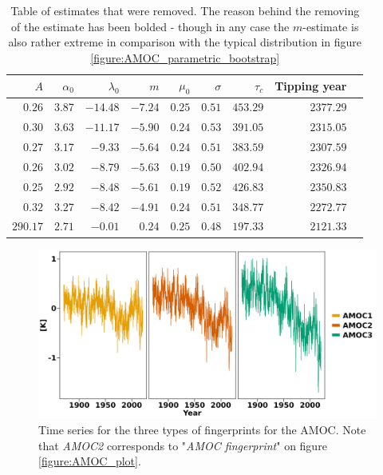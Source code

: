     \begin{table}[ht]
        \centering
        \begin{tabular}{rrrrrrrrr}
            \hline
            $A$ & $\alpha_0$ & $\lambda_0$ & $m$ & $\mu_0$ & $\sigma$ & $\tau_c$ & Tipping year \\ 
            \hline
            $0.26$ & $3.87$ & $-14.48$ & $-7.24$ & $0.25$ & $0.51$ & $453.29$ & $2377.29$ \\ 
            $0.30$ & $3.63$ & $-11.17$ & $-5.90$ & $0.24$ & $0.53$ & $391.05$ & $2315.05$ \\ 
            $0.27$ & $3.17$ & $-9.33$ & $-5.64$ & $0.24$ & $0.51$ & $383.59$ & $2307.59$ \\ 
            $0.26$ & $3.02$ & $-8.79$ & $-5.63$ & $0.19$ & $0.50$ & $402.94$ & $2326.94$ \\ 
            $0.25$ & $2.92$ & $-8.48$ & $-5.61$ & $0.19$ & $0.52$ & $426.83$ & $2350.83$ \\ 
            $0.32$ & $3.27$ & $-8.42$ & $-4.91$ & $0.24$ & $0.51$ & $348.77$ & $2272.77$ \\ 
            $290.17$ & $2.71$ & $-0.01$ & $0.24$& $0.25$ & $0.48$ & $197.33$ & $2121.33$ \\ 
             \hline
        \end{tabular}
        \caption{Table of estimates that were removed. The reason behind the removing of the estimate has been bolded - though in any case the $m$-estimate is also rather extreme in comparison with the typical distribution in figure \ref{figure:AMOC_parametric_bootstrap}}
        \label{table:extreme_amoc_estimates}
    \end{table}
    \begin{figure}[h!]
        \begin{center}
            \includegraphics[scale = .1]{figures/AMOC_alt_plot.jpeg}
            \caption{Time series for the three types of fingerprints for the AMOC. Note that \textit{AMOC2} corresponds to "\textit{AMOC fingerprint}" on figure \ref{figure:AMOC_plot}.}
            \label{figure:allAMOCFingerprints}
        \end{center}
    \end{figure}
  